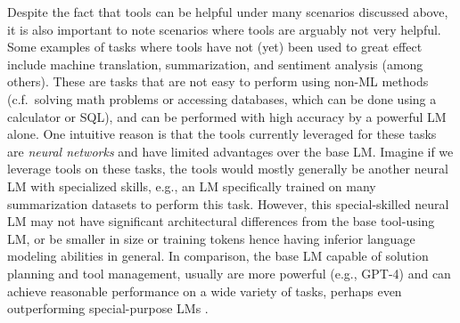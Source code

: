 Despite the fact that tools can be helpful under many scenarios discussed above, it is also important to note scenarios where tools are arguably not very helpful.
Some examples of tasks where tools have not (yet) been used to great effect include machine translation, summarization, and sentiment analysis (among others).
These are tasks that are not easy to perform using non-ML methods (c.f.~solving math problems or accessing databases, which can be done using a calculator or SQL), and can be performed with high accuracy by a powerful LM alone.
One intuitive reason is that the tools currently leveraged for these tasks are \textit{neural networks} and have limited advantages over the base LM.
Imagine if we leverage tools on these tasks, the tools would mostly generally be another neural LM with specialized skills, e.g., an LM specifically trained on many summarization datasets to perform this task. However, this special-skilled neural LM may not have significant architectural differences from the base tool-using LM, or be smaller in size or training tokens hence having inferior language modeling abilities in general.
In comparison, the base LM capable of solution planning and tool management, usually are more powerful (e.g., GPT-4) and can achieve reasonable performance on a wide variety of tasks, perhaps even outperforming special-purpose LMs \citep{robinson-etal-2023-chatgpt}.
